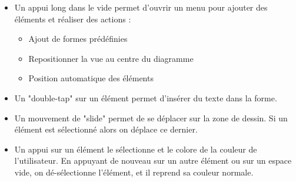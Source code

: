 \begin{itemize}
\item Un appui long dans le vide permet d'ouvrir un menu pour ajouter des éléments et réaliser des actions :
		\begin{itemize}
			\item Ajout de formes prédéfinies
			\item Repositionner la vue au centre du diagramme
			\item Position automatique des éléments
		\end{itemize}
\item Un "double-tap" sur un élément permet d'insérer du texte dans la forme.
\item Un mouvement de "slide" permet de se déplacer sur la zone de dessin. Si un élément est sélectionné alors on déplace ce dernier.
\item Un appui sur un élément le sélectionne et le colore de la couleur de l'utilisateur. En appuyant de nouveau sur un autre élément ou sur un espace vide, on dé-sélectionne l'élément, et il reprend sa couleur normale.


\end{itemize}

